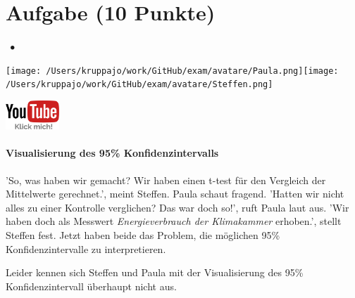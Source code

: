 \documentclass[a4paper, 9pt]{scrartcl}\usepackage[]{graphicx}\usepackage[]{xcolor}
\begin{document}
\section{Aufgabe \hfill (10 Punkte)}


 
\ifcollection
\begin{flushright}
\tiny
\textbf{\examinhaltstart}
\exammodulestatversuch $\;\bullet$
\exammodulebiostat
\vspace{-4Ex}
\end{flushright}
\begin{minipage}[t]{0.5\textwidth}
\texttt{[image: /Users/kruppajo/work/GitHub/exam/avatare/Paula.png]}\hspace{-4mm}\texttt{[image: /Users/kruppajo/work/GitHub/exam/avatare/Steffen.png]}
\end{minipage}
\begin{minipage}[t]{0.5\textwidth}
\hfill
\href{https://youtu.be/CN_O4fYPbhs}{\includegraphics[width = 2cm]{img/youtube}}
\end{minipage}
\fi



\ifcollection
\paragraph{Visualisierung des 95\% Konfidenzintervalls}
\fi

'So, was haben wir gemacht? Wir haben einen t-test für den Vergleich der Mittelwerte gerechnet.', meint Steffen. Paula schaut fragend. 'Hatten wir nicht alles zu einer Kontrolle verglichen? Das war doch so!', ruft Paula laut aus. 'Wir haben doch als Messwert \textit{Energieverbrauch der Klimakammer} erhoben.', stellt Steffen fest. Jetzt haben beide das Problem, die möglichen 95\% Konfidenzintervalle zu interpretieren.

\vspace{1ex}

Leider kennen sich Steffen und Paula mit der Visualisierung des 95\% Konfidenzintervall überhaupt nicht aus. 
\end{document}
